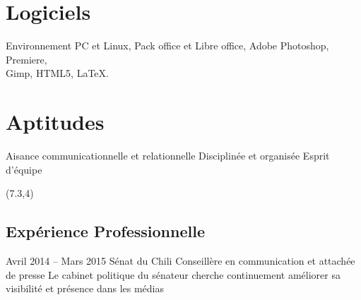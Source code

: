 \documentclass[30pt, french]{tccv}
\begin{document}
\begin{upshape}
\begin{textblock}{6.5}
\begin{mdframed}
\vspace{0.5cm}
\section{Logiciels}
Environnement PC et Linux,
Pack office et Libre office,
Adobe Photoshop, Premiere, \\
Gimp,
HTML5,
\LaTeX.

\vspace{0.5cm}
\section{Aptitudes}
\begin{itemize}[leftmargin=13pt]
  \setlength\itemsep{-3pt} 
  \cvitem[\checkmark]  Aisance communicationnelle et relationnelle 
  \cvitem[\checkmark]  Disciplinée et organisée 
  \cvitem[\checkmark]  Esprit d'équipe 
\end{itemize}



\end{mdframed}
\end{textblock}



\begin{textblock}{13.3}(7.3,4)
\begin{mdframed}
\section{Expérience Professionnelle}


\begin{eventlist}

\setlength{\parskip}{0pt}
\item{Avril 2014 -- Mars 2015}
     {Sénat du Chili}
     {Conseillère en communication et attachée de presse}
     \fontsize{9pt}{1em}\color{text}\bodyfontlight\upshape\selectfont
      Le cabinet politique du sénateur  cherche continuement améliorer sa visibilité et présence dans les médias \\ 


\end{eventlist}
\end{mdframed}
\end{textblock}
\end{upshape}
\end{document}
